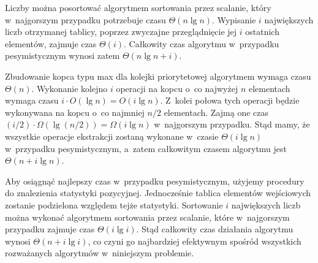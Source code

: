 
\subproblem %
Liczby można posortować algorytmem sortowania przez scalanie, który w~najgorszym przypadku potrzebuje czasu $\Theta(n\lg n)$.
Wypisanie $i$ największych liczb otrzymanej tablicy, poprzez zwyczajne przeglądnięcie jej $i$ ostatnich elementów, zajmuje czas $\Theta(i)$.
Całkowity czas algorytmu w~przypadku pesymistycznym wynosi zatem $\Theta(n\lg n+i)$.

\subproblem %
Zbudowanie kopca typu max dla kolejki priorytetowej algorytmem  wymaga czasu $\Theta(n)$.
Wykonanie kolejno $i$ operacji  na kopcu o~co najwyżej $n$ elementach wymaga czasu $i\cdot O(\lg n)=O(i\lg n)$.
Z~kolei połowa tych operacji będzie wykonywana na kopcu o~co najmniej $n/2$ elementach.
Zajmą one czas $(i/2)\cdot\Omega(\lg(n/2))=\Omega(i\lg n)$ w~najgorszym przypadku.
Stąd mamy, że wszystkie operacje ekstrakcji zostaną wykonane w~czasie $\Theta(i\lg n)$ w~przypadku pesymistycznym, a~zatem całkowitym czasem algorytmu jest $\Theta(n+i\lg n)$.

\subproblem %
Aby osiągnąć najlepszy czas w~przypadku pesymistycznym, użyjemy procedury  do znalezienia  statystyki pozycyjnej.
Jednocześnie tablica elementów wejściowych zostanie podzielona względem tejże statystyki.
Sortowanie $i$ największych liczb można wykonać algorytmem sortowania przez scalanie, które w~najgorszym przypadku zajmuje czas $\Theta(i\lg i)$.
Stąd całkowity czas działania algorytmu wynosi $\Theta(n+i\lg i)$, co czyni go najbardziej efektywnym spośród wszystkich rozważanych algorytmów w~niniejszym problemie.
